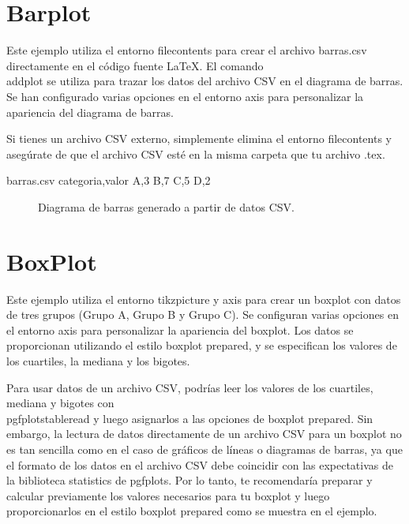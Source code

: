 \documentclass{article}
\begin{document}
\section{Barplot}
Este ejemplo utiliza el entorno filecontents para crear el archivo barras.csv directamente en el código fuente LaTeX. El comando \\addplot se utiliza para trazar los datos del archivo CSV en el diagrama de barras. Se han configurado varias opciones en el entorno axis para personalizar la apariencia del diagrama de barras.

Si tienes un archivo CSV externo, simplemente elimina el entorno filecontents y asegúrate de que el archivo CSV esté en la misma carpeta que tu archivo .tex.
\begin{filecontents*}{barras.csv}
categoria,valor
A,3
B,7
C,5
D,2
\end{filecontents*}

\pgfplotsset{compat=1.17}

\begin{figure}[h!]
\centering
{}
\caption{Diagrama de barras generado a partir de datos CSV.}
\end{figure}
\clearpage

\section{BoxPlot}


Este ejemplo utiliza el entorno tikzpicture y axis para crear un boxplot con datos de tres grupos (Grupo A, Grupo B y Grupo C). Se configuran varias opciones en el entorno axis para personalizar la apariencia del boxplot. Los datos se proporcionan utilizando el estilo boxplot prepared, y se especifican los valores de los cuartiles, la mediana y los bigotes.

Para usar datos de un archivo CSV, podrías leer los valores de los cuartiles, mediana y bigotes con \\pgfplotstableread y luego asignarlos a las opciones de boxplot prepared. Sin embargo, la lectura de datos directamente de un archivo CSV para un boxplot no es tan sencilla como en el caso de gráficos de líneas o diagramas de barras, ya que el formato de los datos en el archivo CSV debe coincidir con las expectativas de la biblioteca statistics de pgfplots. Por lo tanto, te recomendaría preparar y calcular previamente los valores necesarios para tu boxplot y luego proporcionarlos en el estilo boxplot prepared como se muestra en el ejemplo.
\end{document}
